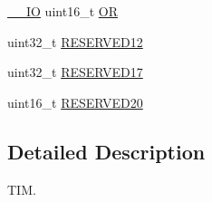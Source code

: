 \begin{DoxyCompactItemize}
\item 
\hyperlink{group___c_m_s_i_s__core__definitions_gaec43007d9998a0a0e01faede4133d6be}{\-\_\-\-\_\-\-I\-O} uint16\-\_\-t \hyperlink{struct_t_i_m___type_def_a145760563b46fcdeedddf7c92ee68d61}{O\-R}
\item 
uint32\-\_\-t \hyperlink{struct_t_i_m___type_def_aebbca147242a5ef58c8d5fe097df2ca5}{R\-E\-S\-E\-R\-V\-E\-D12}
\item 
uint32\-\_\-t \hyperlink{struct_t_i_m___type_def_a4f1ca99eb41a95117de38bb0c66808f3}{R\-E\-S\-E\-R\-V\-E\-D17}
\item 
uint16\-\_\-t \hyperlink{struct_t_i_m___type_def_aebe8039568a704dc6193fe0aaa795813}{R\-E\-S\-E\-R\-V\-E\-D20}
\end{DoxyCompactItemize}


\subsection{Detailed Description}
T\-I\-M. 


